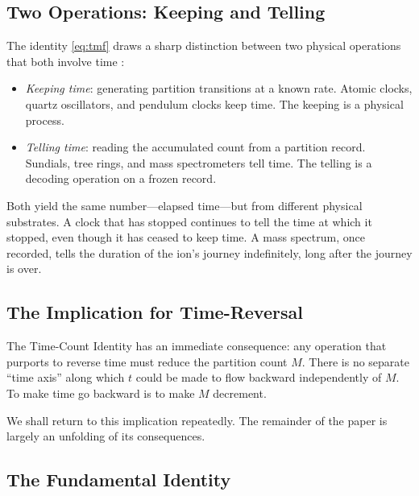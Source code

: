 \documentclass[twocolumn,10pt,a4paper]{article}
\theoremstyle{definition}
\theoremstyle{remark}
\newcommand{\Mcount}{M}
\begin{document}
\subsection{Two Operations: Keeping and Telling}

The identity \eqref{eq:tmf} draws a sharp distinction between two physical operations that both involve time \citep{sachikonye2025temporal}:

\begin{itemize}[leftmargin=1.2em]
    \item \emph{Keeping time}: generating partition transitions at a known rate. Atomic clocks, quartz oscillators, and pendulum clocks keep time. The keeping is a physical process.

    \item \emph{Telling time}: reading the accumulated count from a partition record. Sundials, tree rings, and mass spectrometers tell time. The telling is a decoding operation on a frozen record.
\end{itemize}

Both yield the same number---elapsed time---but from different physical substrates. A clock that has stopped continues to tell the time at which it stopped, even though it has ceased to keep time. A mass spectrum, once recorded, tells the duration of the ion's journey indefinitely, long after the journey is over.

\subsection{The Implication for Time-Reversal}

The Time-Count Identity has an immediate consequence: any operation that purports to reverse time must reduce the partition count $\Mcount$. There is no separate ``time axis'' along which $t$ could be made to flow backward independently of $\Mcount$. To make time go backward is to make $\Mcount$ decrement.

We shall return to this implication repeatedly. The remainder of the paper is largely an unfolding of its consequences.

\subsection{The Fundamental Identity}
\end{document}
